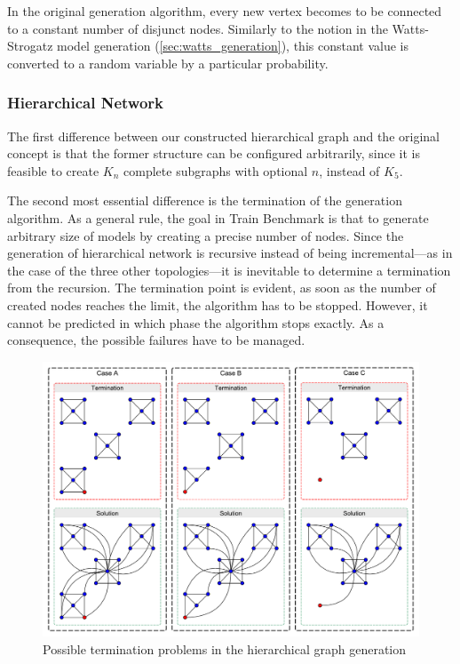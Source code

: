 In the original generation algorithm, every new vertex becomes to be connected to a constant number of disjunct nodes. Similarly to the notion in the Watts-Strogatz model generation (\ref{sec:watts_generation}), this constant value is converted to a random variable by a particular probability.

\subsubsection{Hierarchical Network}\label{sec:hierarcical_contribution}

The first difference between our constructed hierarchical graph and the original concept is that the former structure can be configured arbitrarily, since it is feasible to create $K_n$ complete subgraphs with optional $n$, instead of $K_5$. %

The second most essential difference is the termination of the generation algorithm. As a general rule, the goal in Train Benchmark is that to generate arbitrary size of models by creating a precise number of nodes. Since the generation of hierarchical network is recursive instead of being incremental---as in the case of the three other topologies---it is inevitable to determine a termination from the recursion. The termination point is evident, as soon as the number of created nodes reaches the limit, the algorithm has to be stopped. However, it cannot be predicted in which phase the algorithm stops exactly. As a consequence, the possible failures have to be managed.

\begin{figure}[!ht]
	\centering
	\includegraphics[width=150mm, keepaspectratio]{figures/hierarchical.pdf}
	\caption{Possible termination problems in the hierarchical graph generation}
	\label{fig:hierarchical_problems}
\end{figure}

